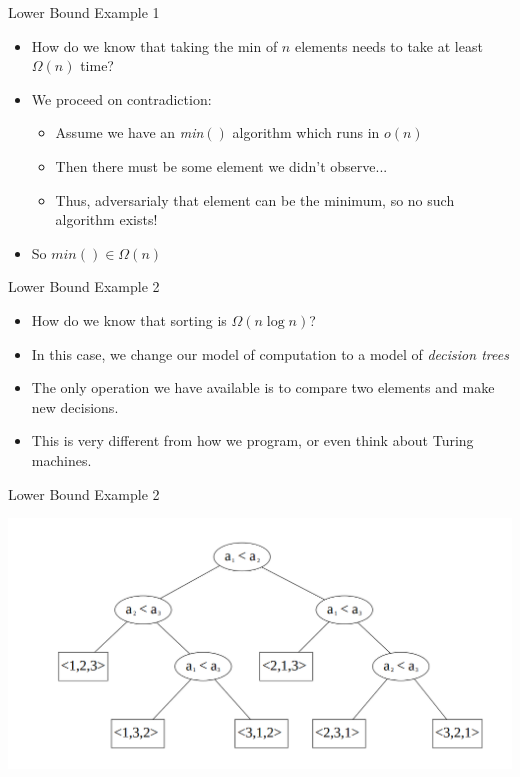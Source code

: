 \documentclass[aspectratio=169]{beamer}
\begin{document}
\begin{frame}{Lower Bound Example 1}
    \begin{itemize}
        \item How do we know that taking the min of $n$ elements needs to take at least $\Omega(n)$ time? \pause
        \item We proceed on contradiction:
        \begin{itemize}
            \item Assume we have an \textit{min}$()$ algorithm which runs in $o(n)$ \pause
            \item Then there must be some element we didn't observe... \pause 
            \item Thus, adversarialy that element can be the minimum, so no such algorithm exists! \pause
        \end{itemize}
        \item So $\textit{min}() \in \Omega(n)$
    \end{itemize}
\end{frame}

\begin{frame}{Lower Bound Example 2}
    \begin{itemize}
        \item How do we know that sorting is $\Omega(n \log n)$? \pause
        \item In this case, we change our model of computation to a model of \textit{decision trees} \pause
        \item The only operation we have available is to compare two elements and make new decisions. \pause
        \item This is very different from how we program, or even think about Turing machines.
    \end{itemize}
\end{frame}

\begin{frame}{Lower Bound Example 2}
  \begin{center}
    \includegraphics[width=\textwidth]{decision_tree.png}
  \end{center}
\end{frame}
\end{document}

